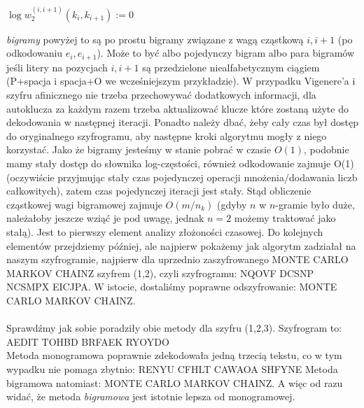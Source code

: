 \documentclass[a4paper]{article}
\begin{document}
\begin{algorithm}[H]
$\log w_2^{(i,i+1)}(k_i, k_{i+1}) := 0$\;
\end{algorithm}
\textit{bigramy} powyżej to są po prostu bigramy związane z wagą cząstkową $i,i+1$ (po odkodowaniu $e_i, e_{i+1}$). Może to być albo pojedynczy bigram albo para bigramów jeśli litery na pozycjach $i, i+1$ są przedzielone niealfabetycznym ciągiem (P+spacja i spacja+O we wcześniejszym przykładzie). W przypadku Vigenere'a i szyfru afinicznego nie trzeba przechowywać dodatkowych informacji, dla autoklucza za każdym razem trzeba aktualizować klucze które zostaną użyte do dekodowania w następnej iteracji. Ponadto należy dbać, żeby cały czas był dostęp do oryginalnego szyfrogramu, aby następne kroki algorytmu mogły z niego korzystać. Jako że bigramy jesteśmy w stanie pobrać w czasie $O(1)$, podobnie mamy stały dostęp do słownika log-częstości, również odkodowanie zajmuje O(1) (oczywiście przyjmując stały czas pojedynczej operacji mnożenia/dodawania liczb całkowitych), zatem czas pojedynczej iteracji jest stały. Stąd obliczenie cząstkowej wagi bigramowej zajmuje $O(m/n_k)$ (gdyby $n$ w $n$-gramie było duże, należałoby jeszcze wziąć je pod uwagę, jednak $n=2$ możemy traktować jako stałą). Jest to pierwszy element analizy złożoności czasowej. Do kolejnych elementów przejdziemy później, ale najpierw pokażemy jak algorytm zadziałał na naszym szyfrogramie, najpierw dla uprzednio zaszyfrowanego MONTE CARLO MARKOV CHAINZ szyfrem (1,2), czyli szyfrogramu:
NQOVF DCSNP NCSMPX EICJPA.
W istocie, dostaliśmy poprawne odszyfrowanie:
MONTE CARLO MARKOV CHAINZ.\\
\\
Sprawdźmy jak sobie poradziły obie metody dla szyfru (1,2,3). Szyfrogram to:\\
AEDIT TOHBD BRFAEK RYOYDO\\
Metoda monogramowa poprawnie zdekodowała jedną trzecią tekstu, co w tym wypadku nie pomaga zbytnio:
RENYU CFHLT CAWAOA SHFYNE
Metoda bigramowa natomiast:
MONTE CARLO MARKOV CHAINZ. A więc od razu widać, że metoda \textit{bigramowa} jest istotnie lepsza od monogramowej.\\
\end{document}
